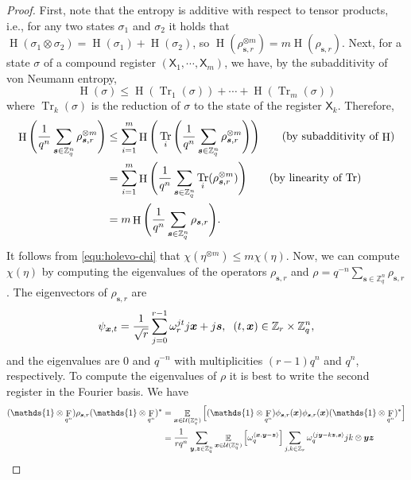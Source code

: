 \documentclass[11pt]{article}
\theoremstyle{plain}
\theoremstyle{definition}
\DeclareMathOperator{\tr}{Tr} %
\DeclareMathOperator{\entpy}{H}
\DeclareMathOperator{\qft}{F}
\DeclareMathOperator{\E}{\mathbb{E}}
\let\ket\relax
\DeclarePairedDelimiter{\ket}{\lvert}{\rangle}
\let\bra\relax
\DeclarePairedDelimiter{\bra}{\langle}{\rvert}
\DeclarePairedDelimiter{\lrang}{\langle}{\rangle}
\def\Z{\mathbb{Z}}
\def\U{\mathcal{U}}
\begin{document}
\begin{proof}
    First, note that the entropy is additive with respect to tensor products, i.e., for any two states $\sigma_1$ and $\sigma_2$ it holds that $\entpy(\sigma_1 \otimes \sigma_2) = \entpy(\sigma_1) + \entpy(\sigma_2)$, so $\entpy(\rho_{\bm{s}, r}^{\otimes m}) = m\entpy(\rho_{\bm{s}, r})$. Next, for a state $\sigma$ of a compound register $(\mathsf{X}_1, \cdots, \mathsf{X}_m)$, we have, by the subadditivity of von Neumann entropy,
    \[ \entpy(\sigma) \le \entpy(\tr_1(\sigma)) + \cdots + \entpy(\tr_m(\sigma))\]
    where $\tr_k(\sigma)$ is the reduction of $\sigma$ to the state of the register $\mathsf{X}_k$. Therefore,
    \begin{align*}
        \entpy\Bigg( \frac{1}{q^n} \sum_{\bm{s} \in \Z_q^n} \rho_{\bm{s}, r}^{\otimes m} \Bigg)
        & \le \sum_{i = 1}^m \entpy\Bigg(\tr_i\Bigg( \frac{1}{q^n} \sum_{\bm{s} \in \Z_q^n} \rho_{\bm{s}, r}^{\otimes m} \Bigg)\Bigg) \tag{by subadditivity of $\entpy$} \\
        & = \sum_{i = 1}^m \entpy\Bigg(\frac{1}{q^n} \sum_{\bm{s} \in \Z_q^n} \tr_i(\rho_{\bm{s}, r}^{\otimes m}) \Bigg) \tag{by linearity of $\tr$} \\
        & = m\entpy\Bigg( \frac{1}{q^n} \sum_{\bm{s} \in \Z_q^n} \rho_{\bm{s}, r} \Bigg).
    \end{align*}
    It follows from \eqref{equ:holevo-chi}  that $\chi(\eta^{\otimes m}) \le m\chi(\eta)$. Now, we can compute $\chi(\eta)$ by computing the eigenvalues of the operators $\rho_{\bm{s}, r}$ and $\rho = q^{-n}\sum_{\bm{s} \in \Z_q^n} \rho_{\bm{s}, r}$. The eigenvectors of $\rho_{\bm{s}, r}$ are
    \[ \ket{\psi_{\bm{x}, t}} = \frac{1}{\sqrt{r}} \sum_{j = 0}^{r - 1} \omega_r^{jt} \ket{j}\ket{\bm{x} + j\bm{s}}, \hspace*{2mm} (t, \bm{x}) \in \Z_r \times \Z_q^n, \]
    and the eigenvalues are $0$ and $q^{-n}$ with multiplicities $(r - 1)q^n$ and $q^n$, respectively. To compute the eigenvalues of $\rho$ it is best to write the second register in the Fourier basis. We have
    \begin{align*}
        (\mathds{1} \otimes \qft_{q^n}) \rho_{\bm{s}, r} (\mathds{1} \otimes \qft_{q^n})^*
        & = \E_{\bm{x} \in \U(\Z_q^n)} \Big[ (\mathds{1} \otimes \qft_{q^n}) \ket{\phi_{\bm{s}, r}(\bm{x})} \bra{\phi_{\bm{s}, r}(\bm{x})} (\mathds{1} \otimes \qft_{q^n})^* \Big] \\
        & = \frac{1}{rq^n} \sum_{\bm{y}, \bm{z} \in \Z_q^n} \E_{\bm{x} \in \U(\Z_q^n)} \Big[ \omega_q^{\lrang{\bm{x}, \bm{y} - \bm{z}}} \Big] \sum_{j, k \in \Z_r} \omega_q^{\lrang{j\bm{y} - k\bm{z}, \bm{s}}} \ket{j}\bra{k} \otimes \ket{\bm{y}}\bra{\bm{z}} \\

\end{align*}
\end{proof}
\end{document}
